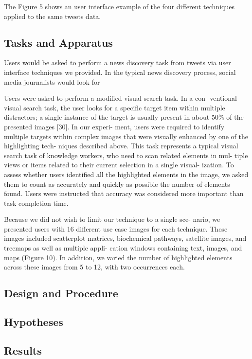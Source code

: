 The Figure 5 shows an user interface example of the four different techniques applied to the same tweets data. 

\subsection{Tasks and Apparatus}

Users would be asked to perform a news discovery task from tweets via user interface techniques we provided. In the typical news discovery process, social media journalists would look for 




Users were asked to perform a modiﬁed visual search task. In a con- ventional visual search task, the user looks for a speciﬁc target item within multiple distractors; a single instance of the target is usually present in about 50\% of the presented images [30]. In our experi- ment, users were required to identify multiple targets within complex images that were visually enhanced by one of the highlighting tech- niques described above. This task represents a typical visual search task of knowledge workers, who need to scan related elements in mul- tiple views or items related to their current selection in a single visual- ization. To assess whether users identiﬁed all the highlighted elements in the image, we asked them to count as accurately and quickly as possible the number of elements found. Users were instructed that accuracy was considered more important than task completion time.

Because we did not wish to limit our technique to a single sce- nario, we presented users with 16 different use case images for each technique. These images included scatterplot matrices, biochemical pathways, satellite images, and treemaps as well as multiple appli- cation windows containing text, images, and maps (Figure 10). In addition, we varied the number of highlighted elements across these images from 5 to 12, with two occurrences each.


\subsection{Design and Procedure}

\subsection{Hypotheses}

\subsection{Results}


